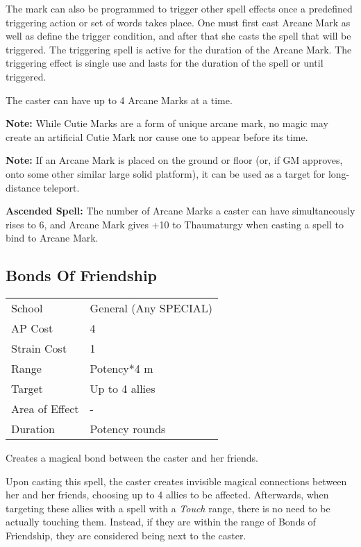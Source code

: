 \documentclass[11pt,a4paper,twocolumn]{book}
\begin{document}
The mark can also be programmed to trigger other spell effects once a predefined triggering action or set of words takes place. One must first cast Arcane Mark as well as define the trigger condition, and after that she casts the spell that will be triggered. The triggering spell is active for the duration of the Arcane Mark. The triggering effect is single use and lasts for the duration of the spell or until triggered.

The caster can have up to 4 Arcane Marks at a time.

\textbf{Note:} While Cutie Marks are a form of unique arcane mark, no magic may create an artificial Cutie Mark nor cause one to appear before its time.

\textbf{Note:} If an Arcane Mark is placed on the ground or floor (or, if GM approves, onto some other similar large solid platform), it can be used as a target for long-distance teleport.

\bigskip

\textbf{Ascended Spell:} The number of Arcane Marks a caster can have simultaneously rises to 6, and Arcane Mark gives +10 to Thaumaturgy when casting a spell to bind to Arcane Mark. 

\medskip

\subsection*{Bonds Of Friendship}

{
	\begin{tabu} to 75mm{| X[l,4] | X[l,7] |}
		\hline
		School 			& General (Any SPECIAL) 	\\
		AP Cost	      	& 4 					\\
		Strain Cost     & 1 					\\
		Range     		& Potency*4 m 			\\
		Target      	& Up to 4 allies			\\
		Area of Effect  & - 	 				\\
		Duration     	& Potency rounds 		\\ \hline
	\end{tabu}
	
}

\medskip

Creates a magical bond between the caster and her friends.

Upon casting this spell, the caster creates invisible magical connections between her and her friends, choosing up to 4 allies to be affected. Afterwards, when targeting these allies with a spell with a \textit{Touch} range, there is no need to be actually touching them. Instead, if they are within the range of Bonds of Friendship, they are considered being next to the caster.
\end{document}
